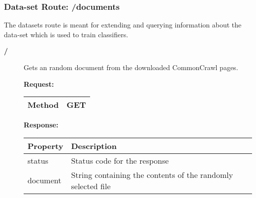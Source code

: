 \subsubsection{Data-set Route: /documents}
The datasets route is meant for extending and querying information about the data-set which is used to train classifiers. 

\begin{description}


\item [\textbf{/}]
Gets an random document from the downloaded CommonCrawl pages.

\newline
\newline
\textbf{Request:}
\newline
\newline
\begin{tabular}{ | l | l |}
\hline
Method & GET\\ \hline
\end{tabular}
\newline
\newline
\textbf{Response:}
\newline
\newline
\resizebox{\textwidth}{!} {
\begin{tabular}{ | l | l |}
\hline
\textbf{Property} & \textbf{Description}\\ \hline
status & Status code for the response\\ \hline
document & String containing the contents of the randomly selected file\\ \hline
\end{tabular}}

\end{description}